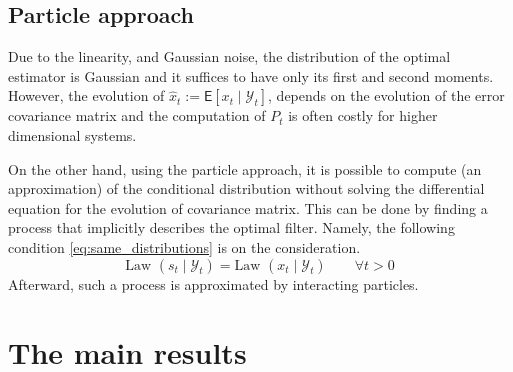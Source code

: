 \documentclass[12pt]{llncs}
\begin{document}
\subsection{Particle approach}

Due to the linearity, and Gaussian noise, the distribution of the optimal estimator is Gaussian and it suffices to have only its first and second moments. However, the evolution of $\widehat x_t := \mathsf{E}[x_t \mid \mathcal{Y}_t]$, depends on the evolution of the error covariance matrix %
and the computation of $P_t$ is often costly for higher dimensional systems.



On the other hand, using the particle approach, it is possible to compute (an approximation) of
the conditional distribution without solving the differential equation for the evolution of covariance matrix.
 This can be done by finding a process  that implicitly describes the optimal filter. Namely, the following condition \eqref{eq:same_distributions} is on the consideration.
 \begin{equation}
    \label{eq:same_distributions}
    \text{Law }(s_t\mid \mathcal{Y}_t) = \text{Law }(x_t \mid \mathcal{Y}_t)    \qquad \forall t>0
    \end{equation}
Afterward, such a process is approximated by interacting particles.



\section{The main results} %
\end{document}

